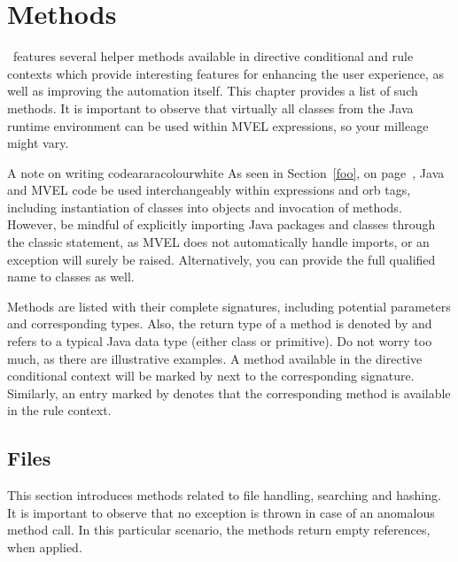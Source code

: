 \chapter{Methods}
\label{chap:methods}

\arara\ features several helper methods available in directive conditional and rule contexts which provide interesting features for enhancing the user experience, as well as improving the automation itself. This chapter provides a list of such methods. It is important to observe that virtually all classes from the Java runtime environment can be used within MVEL expressions, so your milleage might vary.

\begin{messagebox}{A note on writing code}{araracolour}{\icok}{white}
As seen in Section~\ref{foo}, on page~\pageref{foo}, Java and MVEL code be used interchangeably within expressions and orb tags, including instantiation of classes into objects and invocation of methods. However, be mindful of explicitly importing Java packages and classes through the classic  statement, as MVEL does not automatically handle imports, or an exception will surely be raised. Alternatively, you can provide the full qualified name to classes as well.
\end{messagebox}

Methods are listed with their complete signatures, including potential  parameters and corresponding types. Also, the return type of a method is denoted by  and refers to a typical Java data type (either class or primitive). Do not worry too much, as there are illustrative examples. A method available in the directive conditional context will be marked by  next to the corresponding signature. Similarly, an entry marked by  denotes that the corresponding method is available in the rule context.

\section{Files}
\label{sec:files}

This section introduces methods related to file handling, searching and hashing. It is important to observe that no exception is thrown in case of an anomalous method call. In this particular scenario, the methods return empty references, when applied.

